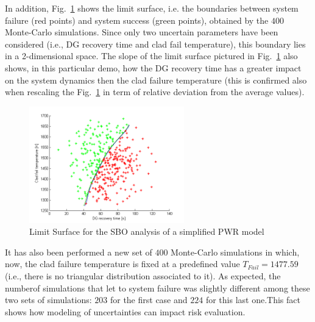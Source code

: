 \documentclass{mc2013}
\begin{document}
In addition, Fig.~\ref{fig:limit_surface_rng_temp_and_dg} shows the limit surface, i.e. the boundaries between system failure (red points) and system success (green points), obtained by the $400$ Monte-Carlo simulations. Since only two uncertain parameters have been considered (i.e., DG recovery time and clad fail temperature), this boundary lies in a 2-dimensional space.
The slope of the limit surface pictured in Fig.~\ref{fig:limit_surface_rng_temp_and_dg} also shows, in this particular demo, how the DG recovery time has a greater impact on the system dynamics then the clad failure temperature (this is confirmed also when rescaling the Fig.~\ref{fig:limit_surface_rng_temp_and_dg} in term of relative deviation from the average values).

\begin{figure}[h]
   \centering
    \includegraphics[width=0.6\textwidth]{figures/PRA_limitSurface.png}
    \caption{Limit Surface for the SBO analysis of a simplified PWR model}
    \label{fig:limit_surface_rng_temp_and_dg}
\end{figure}

It has also been performed a new set of $400$ Monte-Carlo simulations in which, now, the clad failure temperature is fixed at a predefined value $T_{Fail}=1477.59$ (i.e., there is no triangular distribution associated to it). As expected, the numberof simulations that let to system failure was slightly different among these two sets of simulations: $203$ for the first case and $224$ for this last one.This fact shows how modeling of uncertainties can impact risk evaluation.

\end{document}
